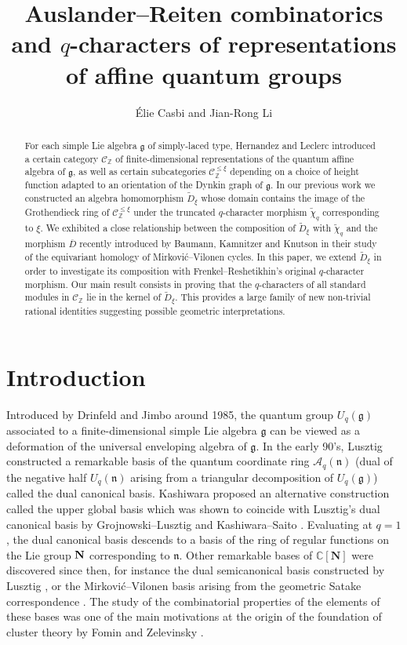 \documentclass[12pt]{amsart}
\title[Auslander--Reiten combinatorics and $q$-characters]{Auslander--Reiten combinatorics and $q$-characters of representations of affine quantum groups}
\author{\'Elie Casbi and Jian-Rong Li}
\date{}
\theoremstyle{plain}
\theoremstyle{definition}
\numberwithin{equation}{section}
\newcommand{\tchi}{{\widetilde{\chi}}}
\newcommand{\tdxi}{\widetilde{D}_{\xi}}
\newcommand{\barD}{\overline{D}}
\newcommand{\CN}{\mathbb{C}[\mathbf{N}]}
\newcommand{\CZ}{\mathcal{C}_{\mathbb{Z}}}
\newcommand{\CxiZ}{\mathcal{C}_{\mathbb{Z}}^{\leq \xi}}
\newcommand{\Aqn}{\mathcal{A}_q(\mathfrak{n})}
\begin{document}
 \begin{abstract}
  For each simple Lie algebra $\mathfrak{g}$ of simply-laced type, Hernandez and Leclerc introduced a certain category $\CZ$ of finite-dimensional representations of the quantum affine algebra of $\mathfrak{g}$, as well as certain subcategories $\CxiZ$ depending on a choice of height function adapted to an orientation of the Dynkin graph of $\mathfrak{g}$. 
   In our previous work we constructed an algebra homomorphism $\tdxi$ whose domain contains the image of the Grothendieck ring of $\CxiZ$ under the  truncated $q$-character morphism $\tchi_q$ corresponding to $\xi$. We exhibited a close relationship  between the composition of $\tdxi$ with $\tchi_q$ and the morphism $\barD$ recently introduced by Baumann, Kamnitzer and Knutson in their study of the equivariant homology of Mirkovi\'c--Vilonen cycles. In this paper, we extend $\tdxi$ in order to investigate its composition with Frenkel--Reshetikhin's original $q$-character morphism. Our main result consists in proving that the $q$-characters of all standard modules in $\CZ$ lie in the kernel of $\tdxi$. This provides a large family of new non-trivial rational identities suggesting possible geometric interpretations. 
 \end{abstract} 

 \maketitle

\section{Introduction}

Introduced by Drinfeld \cite{Dri86} and Jimbo \cite{Jim85} around 1985, the quantum group $U_q(\mathfrak{g})$ associated to a finite-dimensional simple Lie algebra $\mathfrak{g}$ can be viewed as a deformation of the universal enveloping algebra of $\mathfrak{g}$. 
 In the early 90's, Lusztig \cite{Lus90} constructed a remarkable basis of the quantum coordinate ring $\Aqn$ (dual of the negative half $U_q(\mathfrak{n})$ arising from a triangular decomposition of $U_q(\mathfrak{g})$) called the dual canonical basis. Kashiwara \cite{Kas91} proposed an alternative construction called the upper global basis which was shown  to coincide with Lusztig's dual canonical basis by Grojnowski--Lusztig \cite{grojnowski1993comparison} and Kashiwara--Saito \cite{kashiwara1997geometric}. Evaluating at $q=1$, the dual canonical basis descends to a basis of the ring of regular functions on the Lie group ${\bf N}$ corresponding to $\mathfrak{n}$.  Other remarkable bases of $\CN$ were discovered since then, for instance the dual semicanonical basis constructed by Lusztig \cite{lusztig2000semicanonical}, or the Mirkovi\'c--Vilonen basis arising from the geometric Satake correspondence \cite{MV00}. 
 The study of the combinatorial properties of the elements of these bases  was one of the main motivations at the origin of the foundation of cluster theory by Fomin and Zelevinsky \cite{FZ02}. 
\end{document}
